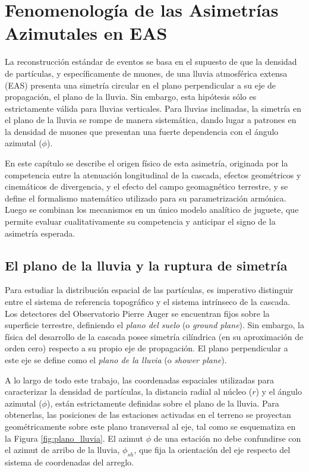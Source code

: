 
\chapter{Fenomenología de las Asimetrías Azimutales en EAS}
\label{sec:fenomenologia}

La reconstrucción estándar de eventos se basa en el supuesto de que la densidad de partículas, y específicamente de muones, de una lluvia atmosférica extensa (EAS) presenta una simetría circular en el plano perpendicular a su eje de propagación, el plano de la lluvia. Sin embargo, esta hipótesis sólo es estrictamente válida para lluvias verticales. Para lluvias inclinadas, la simetría en el plano de la lluvia se rompe de manera sistemática, dando lugar a patrones en la densidad de muones que presentan una fuerte dependencia con el ángulo azimutal ($\phi$).

En este capítulo se describe el origen físico de esta asimetría, originada por la competencia entre la atenuación longitudinal de la cascada, efectos geométricos y cinemáticos de divergencia, y el efecto del campo geomagnético terrestre, y se define el formalismo matemático utilizado para su parametrización armónica. Luego se combinan los mecanismos en un único modelo analítico de juguete, que permite evaluar cualitativamente su competencia y anticipar el signo de la asimetría esperada.

\section{El plano de la lluvia y la ruptura de simetría}
\label{subsec:simetria_ruptura}

Para estudiar la distribución espacial de las partículas, es imperativo distinguir entre el sistema de referencia topográfico y el sistema intrínseco de la cascada. Los detectores del Observatorio Pierre Auger se encuentran fijos sobre la superficie terrestre, definiendo el \textit{plano del suelo} (o \textit{ground plane}). Sin embargo, la física del desarrollo de la cascada posee simetría cilíndrica (en su aproximación de orden cero) respecto a su propio eje de propagación. El plano perpendicular a este eje se define como el \textit{plano de la lluvia} (o \textit{shower plane}).

A lo largo de todo este trabajo, las coordenadas espaciales utilizadas para caracterizar la densidad de partículas, la distancia radial al núcleo ($r$) y el ángulo azimutal ($\phi$), están estrictamente definidas sobre el plano de la lluvia. Para obtenerlas, las posiciones de las estaciones activadas en el terreno se proyectan geométricamente sobre este plano transversal al eje, tal como se esquematiza en la Figura \ref{fig:plano_lluvia}. El azimut $\phi$ de una estación no debe confundirse con el azimut de arribo de la lluvia, $\phi_{sh}$, que fija la orientación del eje respecto del sistema de coordenadas del arreglo.

